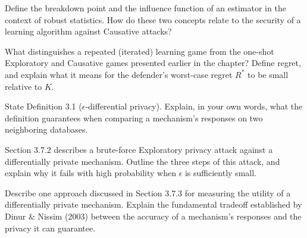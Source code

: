 \documentclass[10pt]{extarticle}
\begin{document}
\begin{questoes}
\item Define the breakdown point and the influence function of an estimator in the context of robust statistics. How do these two concepts relate to the security of a learning algorithm against Causative attacks?

\item What distinguishes a repeated (iterated) learning game from the one-shot Exploratory and Causative games presented earlier in the chapter? Define regret, and explain what it means for the defender's worst-case regret $R^*$ to be small relative to $K$.

\item State Definition 3.1 ($\epsilon$-differential privacy). Explain, in your own words, what the definition guarantees when comparing a mechanism's responses on two neighboring databases.

\item Section 3.7.2 describes a brute-force Exploratory privacy attack against a differentially private mechanism. Outline the three steps of this attack, and explain why it fails with high probability when $\epsilon$ is sufficiently small.

\item Describe one approach discussed in Section 3.7.3 for measuring the utility of a differentially private mechanism. Explain the fundamental tradeoff established by Dinur \& Nissim (2003) between the accuracy of a mechanism's responses and the privacy it can guarantee.

\end{questoes}
\end{document}
